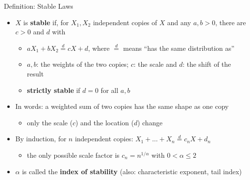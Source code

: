 \begin{frame}{Definition: Stable Laws}
\itemsize{\small}
\begin{itemize}
    \item $X$ is \textbf{stable} if, for $X_1, X_2$ independent copies of $X$ and any $a, b > 0$, there are $c > 0$ and $d$ with
    \begin{itemize}
        \item $aX_1 + bX_2 \overset{d}{=} cX + d$, where $\overset{d}{=}$ means ``has the same distribution as''
        \item $a, b$: the weights of the two copies; $c$: the scale and $d$: the shift of the result
        \item \textbf{strictly stable} if $d = 0$ for all $a, b$
    \end{itemize}
    \item In words: a weighted sum of two copies has the same shape as one copy
    \begin{itemize}
        \item only the scale ($c$) and the location ($d$) change
    \end{itemize}
    \item By induction, for $n$ independent copies: $X_1 + \dots + X_n \overset{d}{=} c_n X + d_n$
    \begin{itemize}
        \item the only possible scale factor is $c_n = n^{1/\alpha}$ with $0 < \alpha \le 2$ 
    \end{itemize}
    \item $\alpha$ is called the \textbf{index of stability} (also: characteristic exponent, tail index)
\end{itemize}
\end{frame}


